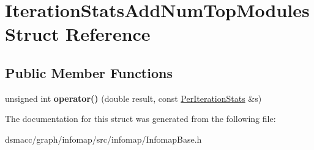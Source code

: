 \hypertarget{structIterationStatsAddNumTopModules}{}\section{Iteration\+Stats\+Add\+Num\+Top\+Modules Struct Reference}
\label{structIterationStatsAddNumTopModules}
\subsection*{Public Member Functions}
\begin{DoxyCompactItemize}
\item 
\mbox{\label{structIterationStatsAddNumTopModules_a4c2d7f4b65679bda6a4ffe671a350e83}} 
unsigned int {\bfseries operator()} (double result, const \mbox{\hyperlink{structPerIterationStats}{Per\+Iteration\+Stats}} \&s)
\end{DoxyCompactItemize}


The documentation for this struct was generated from the following file\+:\begin{DoxyCompactItemize}
\item 
dsmacc/graph/infomap/src/infomap/Infomap\+Base.\+h\end{DoxyCompactItemize}
